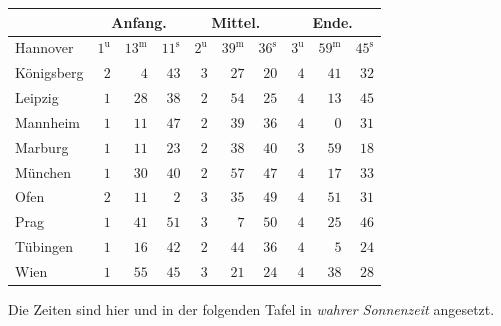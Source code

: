 \begin{center}\small\setlength{\tabcolsep}{3pt}
\begin{tabular}{l|rrr|rrr|rrr}
  &  \multicolumn{3}{c|}{Anfang.}  &  \multicolumn{3}{c|}{Mittel.}  &  \multicolumn{3}{c}{Ende.}  \\
\hline
 Hannover  &  $1^{\mathrm u}$  &  $13^{\mathrm m}$  &  $11^{\mathrm s}$  &  $2^{\mathrm u}$  &  $39^{\mathrm m}$  &  $36^{\mathrm s}$  &  $3^{\mathrm u}$  &  $59^{\mathrm m}$  &  $45^{\mathrm s}$ \\
 Königsberg  &  $2$  &  $4$  &  $43$  &  $3$  &  $27$  &  $20$  &  $4$  &  $41$  &  $32$ \\
 Leipzig  &  $1$  &  $28$  &  $38$  &  $2$  &  $54$  &  $25$  &  $4$  &  $13$  &  $45$ \\
 Mannheim  &  $1$  &  $11$  &  $47$  &  $2$  &  $39$  &  $36$  &  $4$  &  $0$  &  $31$ \\
 Marburg  &  $1$  &  $11$  &  $23$  &  $2$  &  $38$  &  $40$  &  $3$  &  $59$  &  $18$ \\
 München  &  $1$  &  $30$  &  $40$  &  $2$  &  $57$  &  $47$  &  $4$  &  $17$  &  $33$ \\
 Ofen  &  $2$  &  $11$  &  $2$  &  $3$  &  $35$  &  $49$  &  $4$  &  $51$  &  $31$ \\
 Prag  &  $1$  &  $41$  &  $51$  &  $3$  &  $7$  &  $50$  &  $4$  &  $25$  &  $46$ \\
 Tübingen  &  $1$  &  $16$  &  $42$  &  $2$  &  $44$  &  $36$  &  $4$  &  $5$  &  $24$ \\
 Wien  &  $1$  &  $55$  &  $45$  &  $3$  &  $21$  &  $24$  &  $4$  &  $38$  &  $28$ \\
\end{tabular}
\end{center}

Die Zeiten sind hier und in der folgenden Tafel in \emph{wahrer Sonnenzeit} angesetzt.

